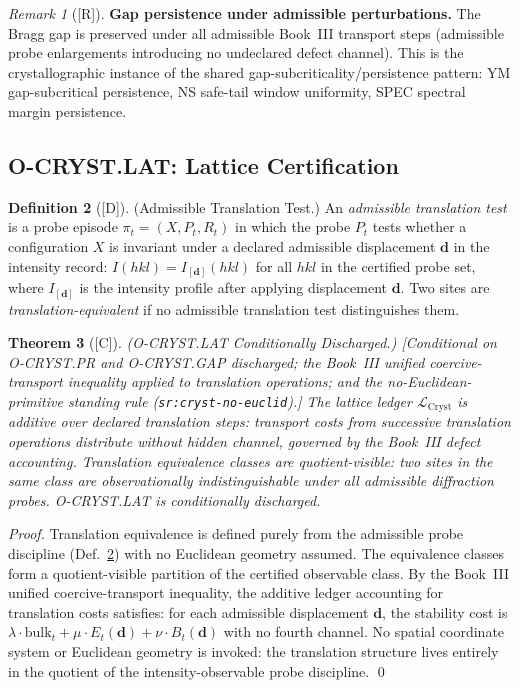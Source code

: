 \documentclass[12pt,oneside]{amsbook}
\theoremstyle{plain}
\newtheorem{theorem}{Theorem}[section]
\theoremstyle{definition}
\newtheorem{definition}[theorem]{Definition}
\theoremstyle{remark}
\newtheorem{remark}[theorem]{Remark}
\newcommand{\status}[1]{\textup{[#1]}}
\begin{document}
\begin{remark}[\status{R}]\label{rem:cryst-gap-persistence}
\textbf{Gap persistence under admissible perturbations.}
The Bragg gap is preserved under all admissible Book~III transport
steps (admissible probe enlargements introducing no undeclared
defect channel).  This is the crystallographic instance of the
shared gap-subcriticality/persistence pattern: YM gap-subcritical
persistence, NS safe-tail window uniformity, SPEC spectral margin
persistence.
\end{remark}

\subsection{O-CRYST.LAT: Lattice Certification}
\label{sec:cryst-LAT-discharge}

\begin{definition}[\status{D}]\label{def:cryst-translation-probe}
\textup{(Admissible Translation Test.)}
An \emph{admissible translation test} is a probe episode
$\pi_t = (X, P_t, R_t)$ in which the probe $P_t$ tests whether
a configuration $X$ is invariant under a declared admissible
displacement $\mathbf{d}$ in the intensity record:
$I(hkl) = I_{[\mathbf{d}]}(hkl)$ for all $hkl$ in the certified
probe set, where $I_{[\mathbf{d}]}$ is the intensity profile after
applying displacement $\mathbf{d}$.  Two sites are
\emph{translation-equivalent} if no admissible translation test
distinguishes them.
\end{definition}

\begin{theorem}[\status{C}]\label{thm:cryst-LAT-discharged}
\textup{(O-CRYST.LAT Conditionally Discharged.)}
\textup{[Conditional on O-CRYST.PR and O-CRYST.GAP discharged;
the Book~III unified coercive-transport inequality applied to
translation operations; and the no-Euclidean-primitive standing
rule (\texttt{sr:cryst-no-euclid}).]}
The lattice ledger $\mathcal{L}_{\mathrm{Cryst}}$ is additive over
declared translation steps: transport costs from successive
translation operations distribute without hidden channel, governed
by the Book~III defect accounting.  Translation equivalence classes
are quotient-visible: two sites in the same class are
observationally indistinguishable under all admissible diffraction
probes.  O-CRYST.LAT is conditionally discharged.
\end{theorem}

\begin{proof}
Translation equivalence is defined purely from the admissible
probe discipline (Def.~\ref{def:cryst-translation-probe}) with no
Euclidean geometry assumed.  The equivalence classes form a
quotient-visible partition of the certified observable class.  By
the Book~III unified coercive-transport inequality, the additive
ledger accounting for translation costs satisfies: for each
admissible displacement $\mathbf{d}$, the stability cost is
$\lambda \cdot \mathrm{bulk}_t + \mu \cdot E_t(\mathbf{d}) +
\nu \cdot B_t(\mathbf{d})$ with no fourth channel.  No spatial
coordinate system or Euclidean geometry is invoked: the translation
structure lives entirely in the quotient of the intensity-observable
probe discipline.
\qed
\end{proof}
\end{document}
